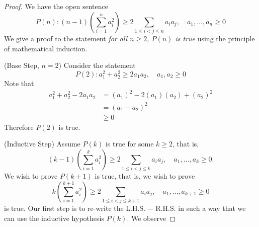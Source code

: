 \begin{proof}
We have the open sentence
\[P(n):(n-1)\left(\sum_{i=1}^n a_i^2 \right) \geq 2 \sum_{1\leq i < j \leq n}a_ia_j,\quad a_1,\ldots,a_n \geq 0\]
We give a proof to the statement \emph{for all $n \geq 2,\ P(n)$ is true} using the principle of mathematical induction.
\item[] (Base Step, $n = 2$) Consider the statement \[P(2):a_1^2 + a_2^2 \geq 2a_1a_2,\quad a_1,a_2 \geq 0\] Note that
\begin{align*}
a_1^2 + a_2^2 - 2a_1a_2 &= (a_1)^2 - 2(a_1)(a_2) + (a_2)^2\\[0.5em]
 &= (a_1 - a_2)^2\\[0.5em]
 &\geq 0
\end{align*}
Therefore $P(2)$ is true.\\
\item[] (Inductive Step) Assume $P(k)$ is true for some $k \geq 2$, that is, \[(k-1)\left(\sum_{i=1}^k a_i^2 \right) \geq 2 \sum_{1\leq i < j \leq k}a_ia_j,\quad a_1,\ldots,a_k \geq 0.\] We wish to prove $P(k+1)$ is true, that is, we wish to prove \[k\left(\sum_{i=1}^{k+1} a_i^2 \right) \geq 2 \sum_{1\leq i < j \leq k+1}a_ia_j,\quad a_1,\ldots,a_{k+1} \geq 0\] is true. Our first step is to re-write the L.H.S. $-$ R.H.S. in such a way that we can use the inductive hypothesis $P(k)$. We observe


\end{proof}
